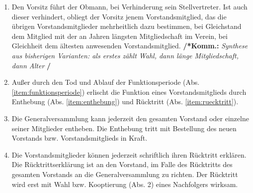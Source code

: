 \documentclass[a4paper,12pt]{article}
\newcommand{\comment}[1]{{\bf /*Komm.:} \textit{#1} {\bf */}}
\begin{document}
\begin{enumerate}
\item Den Vorsitz führt der Obmann, bei Verhinderung sein Stellvertreter.
Ist auch dieser verhindert, obliegt der Vorsitz
jenem Vorstandsmitglied, das die übrigen Vorstandsmitglieder mehrheitlich dazu bestimmen, bei Gleichstand
dem Mitglied mit der an Jahren längsten Mitgliedschaft im Verein, bei Gleichheit dem ältesten anwesenden Vorstandsmitglied. \comment{Synthese aus bisherigen Varianten: als erstes zählt Wahl, dann länge Mitgliedschaft, dann Alter}

\item Außer durch den Tod und Ablauf der Funktionsperiode (Abs. \ref{item:funktionsperiode}) erlischt die Funktion eines Vorstandsmitglieds durch Enthebung (Abs. \ref{item:enthebung}) und Rücktritt (Abs. \ref{item:ruecktritt}).
\item \label{item:enthebung} Die Generalversammlung kann jederzeit den gesamten Vorstand oder einzelne seiner Mitglieder entheben. Die Enthebung tritt mit Bestellung des neuen Vorstands bzw. Vorstandsmitglieds in Kraft.
\item \label{item:ruecktritt} Die Vorstandsmitglieder können jederzeit schriftlich ihren Rücktritt erklären. Die Rücktrittserklärung ist an den Vorstand, im Falle des Rücktritts des gesamten Vorstands an die Generalversammlung zu richten. Der Rücktritt wird erst mit Wahl bzw. Kooptierung (Abs. 2) eines Nachfolgers wirksam.
\end{enumerate}
\end{document}
